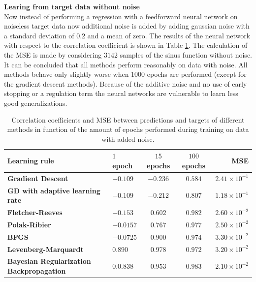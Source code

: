 \documentclass[a4paper,10pt]{article}
\begin{document}
\textbf{Learing from target data without noise}\\
Now instead of performing a regression with a feedforward neural network on noiseless target data now additional noise is added by adding gaussian noise with a standard deviation of $ 0.2 $ and a mean of zero. The results of the neural network with respect to the correlation coefficient is shown in Table \ref{tab:corr_with_noise}. The calculation of the MSE is made by considering $ 3142 $ samples of the sinus function without noise. \\

It can be concluded that all methods perform reasonably on data with noise. All methods behave only slightly worse when $ 1000 $ epochs are performed (except for the gradient descent methods). Because of the additive noise and no use of early stopping or a regulation term the neural networks are vulnerable to learn less good generalizations. 

\begin{table}
	\centering
	\begin{tabular}{@{}l|lccr@{}} \toprule
		\textbf{Learning rule}    & $ 1 $ epoch & $ 15 $ epochs & $ 100 $ epochs & MSE \\\midrule
		\textbf{Gradient Descent}    & $ -0.109 $  & $ -0.236 $  & $ 0.584 $ & $ 2.41\times10^{-1} $ \\
		\textbf{GD with adaptive learning rate} & $ -0.109 $  & $ -0.212 $  & $ 0.807 $ & $ 1.18\times10^{-1} $  \\
		\textbf{Fletcher-Reeves} & $ -0.153 $  & $ 0.602 $  & $ 0.982 $ & $ 2.60\times10^{-2} $ \\
		\textbf{Polak-Ribier} & $ -0.0157 $  & $ 0.767 $  & $ 0.977 $ & $ 2.50\times10^{-2} $  \\
		\textbf{BFGS} & $ -0.0725 $  & $ 0.900 $  & $ 0.974 $ &  $ 3.30\times10^{-2} $\\
		\textbf{Levenberg-Marquardt} & $ 0.890 $  & $ 0.978 $  & $ 0.972 $ &  $ 3.20\times10^{-2} $\\ 
		\textbf{Bayesian Regularization Backpropagation} & $ 0.0.838 $  & $ 0.953 $  & $ 0.983 $ & $ 2.10\times10^{-2} $ \\ \bottomrule
	\end{tabular}
	\caption{Correlation coefficients and MSE between predictions and targets of  different methods in function of the amount of epochs performed during training on data with added noise.}
	\label{tab:corr_with_noise}
\end{table}
\end{document}
